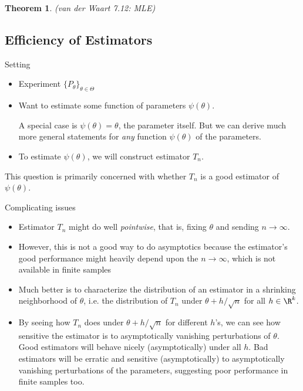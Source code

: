 \documentclass[12pt]{article}
\theoremstyle{plain}
\newtheorem{thm}{Theorem}[section]
\theoremstyle{definition}
\theoremstyle{remark}
\newcommand{\ra}{\rightarrow}
\begin{document}
\begin{thm}\emph{(van der Waart 7.12: MLE)}
\end{thm}




\clearpage
\subsection{Efficiency of Estimators}

Setting
\begin{itemize}
  \item Experiment $\{P_\theta\}_{\theta\in\Theta}$
  \item Want to estimate some function of parameters $\psi(\theta)$.

    A special case is $\psi(\theta)=\theta$, the parameter itself.  But
    we can derive much more general statements for \emph{any} function
    $\psi(\theta)$ of the parameters.

  \item To estimate $\psi(\theta)$, we will construct estimator $T_n$.
\end{itemize}
This question is primarily concerned with whether $T_n$ is a good
estimator of $\psi(\theta)$.

Complicating issues
\begin{itemize}
  \item Estimator $T_n$ might do well \emph{pointwise}, that is, fixing
    $\theta$ and sending $n\ra\infty$.
  \item However, this is not a good way to do asymptotics because the
    estimator's good performance might heavily depend upon the
    $n\ra\infty$, which is not available in finite samples
  \item Much better is to characterize the distribution of an estimator
    in a shrinking neighborhood of $\theta$, i.e.  the distribution of
    $T_n$ under $\theta+h/\sqrt{n}$ for all $h\in\R^k$.

  \item
    By seeing how $T_n$ does under $\theta+h/\sqrt{n}$ for different
    $h$'s, we can see how sensitive the estimator is to asymptotically
    vanishing perturbations of $\theta$.
    Good estimators will behave nicely (asymptotically) under all $h$.
    Bad estimators will be erratic and sensitive (asymptotically) to
    asymptotically vanishing perturbations of the parameters, suggesting
    poor performance in finite samples too.
\end{itemize}
\end{document}
